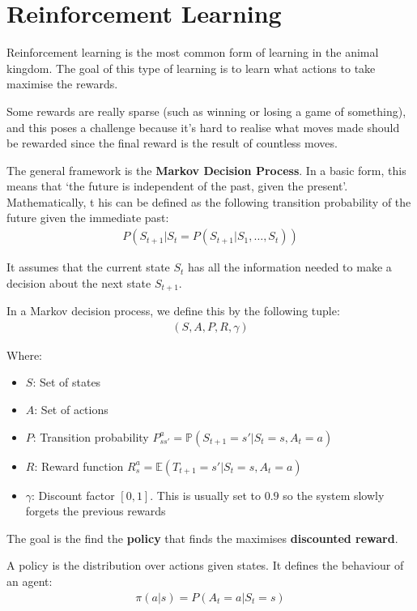 \documentclass[11pt,a4paper,titlepage,dvipsnames,cmyk]{scrartcl}
\begin{document}
\section{Reinforcement Learning}
Reinforcement learning is the most common form of learning in the animal kingdom. The goal of this type of learning is to learn what actions to take maximise the rewards.

Some rewards are really sparse (such as winning or losing a game of something), and this poses a challenge because it's hard to realise what moves made should be rewarded since the final reward is the result of countless moves.

The general framework is the \textbf{Markov Decision Process}. In a basic form, this means that `the future is independent of the past, given the present'. Mathematically, t his can be defined as the following transition probability of the future given the immediate past:
\begin{align*}
P(S_{t+1}|S_t = P(S_{t+1}|S_1, \dots, S_t))
\end{align*}

It assumes that the current state $S_t$ has all the information needed to make a decision about the next state $S_{t+1}$.

In a Markov decision process, we define this by the following tuple:
\begin{align*}
(S,A,P,R,\gamma)
\end{align*}

Where:
\begin{itemize}
    \item $S$: Set of states
    \item $A$: Set of actions
    \item $P$: Transition probability $P^a_{ss'} = \mathbb{P}(S_{t+1} = s' | S_t = s, A_t = a)$
    \item $R$: Reward function $R^a_s = \mathbb{E}(T_{t+1} = s' | S_t = s, A_t = a)$
    \item $\gamma$: Discount factor $[0,1]$. This is usually set to $0.9$ so the system slowly forgets the previous rewards
\end{itemize}

The goal is the find the \textbf{policy} that finds the maximises \textbf{discounted reward}.

A policy is the distribution over actions given states. It defines the behaviour of an agent:
\begin{align*}
\pi(a|s) = P(A_t = a | S_t = s)
\end{align*}
\end{document}
